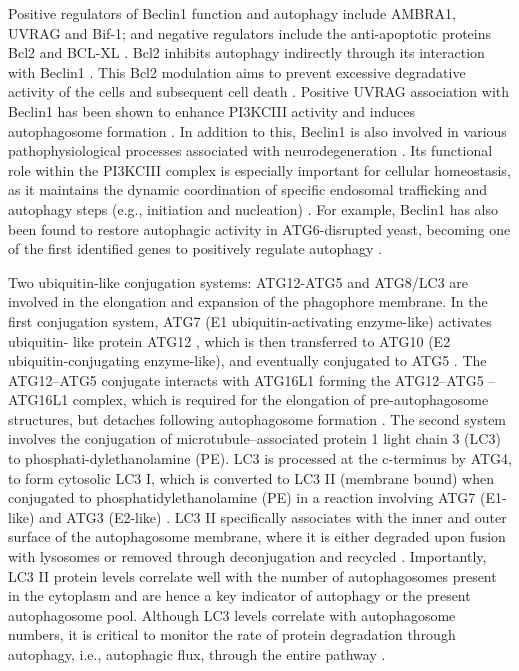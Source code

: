 Positive regulators of Beclin1 function and autophagy include AMBRA1, UVRAG and Bif-1; and negative regulators include the anti-apoptotic proteins Bcl2 and BCL-XL \citep{Pattingre2005,Sinha2008}. Bcl2 inhibits autophagy indirectly through its interaction with Beclin1 \citep{Pattingre2005}. This Bcl2 modulation aims to prevent excessive degradative activity of the cells and subsequent cell death \citep{Pattingre2005}. Positive UVRAG association with Beclin1 has been shown to enhance PI3KCIII activity and induces autophagosome formation \citep{Liang2006}. In addition to this, Beclin1 is also involved in various pathophysiological processes associated with neurodegeneration \citep{He2010}. Its functional role within the PI3KCIII complex is especially important for cellular homeostasis, as it maintains the dynamic coordination of specific endosomal trafficking and autophagy steps (e.g., initiation and nucleation) \citep{Liang2008,Matsunaga2009,Russell2013}. For example, Beclin1 has also been found to restore autophagic activity in ATG6-disrupted yeast, becoming one of the first identified genes to positively regulate autophagy \citep{Liang1999}.

Two ubiquitin-like conjugation systems: ATG12-ATG5 and ATG8/LC3 are involved in the elongation and expansion of the phagophore membrane. In the first conjugation system, ATG7 (E1 ubiquitin-activating enzyme-like) activates ubiquitin- like protein ATG12 \citep{Ohsumi2001,Ohsumi1998}, which is then transferred to ATG10 (E2 ubiquitin-conjugating enzyme-like), and eventually conjugated to ATG5 \citep{Geng2008}. The ATG12–ATG5 conjugate interacts with ATG16L1 forming the ATG12–ATG5 –ATG16L1 complex, which is required for the elongation of pre-autophagosome structures, but detaches following autophagosome formation \citep{Mizushima2003}. The second system involves the conjugation of microtubule–associated protein 1 light chain 3 (LC3) to phosphati-dylethanolamine (PE). LC3 is processed at the c-terminus by ATG4, to form cytosolic LC3 I, which is converted to LC3 II (membrane bound) when conjugated to phosphatidylethanolamine (PE) in a reaction involving ATG7 (E1-like) and ATG3 (E2-like) \citep{kabeya2000,Tanida2004}. LC3 II specifically associates with the inner and outer surface of the autophagosome membrane, where it is either degraded upon fusion with lysosomes or removed through deconjugation and recycled \citep{kabeya2000,Mijaljica2012,Tanida2004}. Importantly, LC3 II protein levels correlate well with the number of autophagosomes present in the cytoplasm and are hence a key indicator of autophagy or the present autophagosome pool. Although LC3 levels correlate with autophagosome numbers, it is critical to monitor the rate of protein degradation through autophagy, i.e., autophagic flux, through the entire pathway \citep{klionsky2016,loos2014}.

